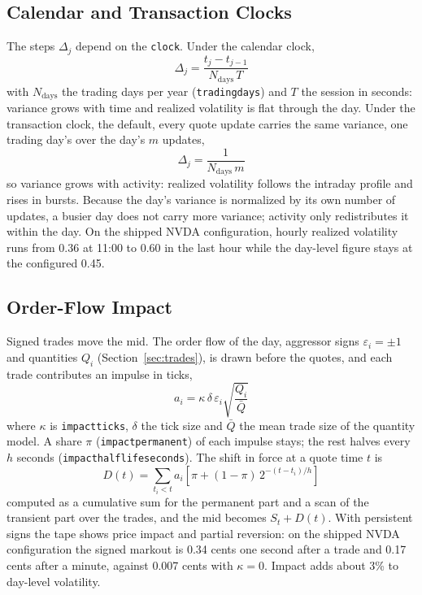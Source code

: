 \documentclass[11pt,a4paper]{article}
\newcommand{\key}[1]{\texttt{#1}}
\theoremstyle{paper}
\begin{document}
\subsection{Calendar and Transaction Clocks}

The steps $\Delta_j$ depend on the \key{clock}. Under the calendar clock,
\begin{equation}
\Delta_j=\frac{t_j-t_{j-1}}{N_{\text{days}}\,T}
\end{equation}
with $N_{\text{days}}$ the trading days per year (\key{tradingdays}) and $T$ the session in seconds: variance grows with time and realized volatility is flat through the day. Under the transaction clock, the default, every quote update carries the same variance, one trading day's over the day's $m$ updates,
\begin{equation}
\Delta_j=\frac{1}{N_{\text{days}}\,m}
\end{equation}
so variance grows with activity: realized volatility follows the intraday profile and rises in bursts. Because the day's variance is normalized by its own number of updates, a busier day does not carry more variance; activity only redistributes it within the day. On the shipped NVDA configuration, hourly realized volatility runs from 0.36 at 11:00 to 0.60 in the last hour while the day-level figure stays at the configured 0.45.

\subsection{Order-Flow Impact}

Signed trades move the mid. The order flow of the day, aggressor signs $\varepsilon_i=\pm1$ and quantities $Q_i$ (Section~\ref{sec:trades}), is drawn before the quotes, and each trade contributes an impulse in ticks,
\begin{equation}
a_i=\kappa\,\delta\,\varepsilon_i\sqrt{\frac{Q_i}{\bar Q}}
\end{equation}
where $\kappa$ is \key{impactticks}, $\delta$ the tick size and $\bar Q$ the mean trade size of the quantity model. A share $\pi$ (\key{impactpermanent}) of each impulse stays; the rest halves every $h$ seconds (\key{impacthalflifeseconds}). The shift in force at a quote time $t$ is
\begin{equation}
D(t)=\sum_{t_i<t}a_i\left[\pi+(1-\pi)\,2^{-(t-t_i)/h}\right]
\end{equation}
computed as a cumulative sum for the permanent part and a scan of the transient part over the trades, and the mid becomes $S_t+D(t)$. With persistent signs the tape shows price impact and partial reversion: on the shipped NVDA configuration the signed markout is 0.34 cents one second after a trade and 0.17 cents after a minute, against 0.007 cents with $\kappa=0$. Impact adds about 3\% to day-level volatility.
\end{document}

